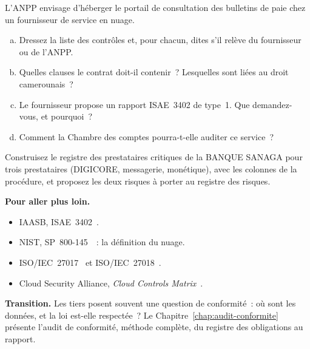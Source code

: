 \begin{boxexo}[title={\ding{45}\quad Exercice~24.9. Un nuage pour l'ANPP \niveauexpert}]
L'ANPP envisage d'héberger le portail de consultation des bulletins de paie
chez un fournisseur de service en nuage.
\begin{enumerate}[(a)]
    \item Dressez la liste des contrôles et, pour chacun, dites s'il
          relève du fournisseur ou de l'ANPP.
    \item Quelles clauses le contrat doit-il contenir~? Lesquelles sont
          liées au droit camerounais~?
    \item Le fournisseur propose un rapport ISAE~3402 de type~1. Que
          demandez-vous, et pourquoi~?
    \item Comment la Chambre des comptes pourra-t-elle auditer ce service~?
\end{enumerate}
\end{boxexo}

\begin{boxexo}[title={\ding{45}\quad Exercice~24.10. Le registre de la BANQUE SANAGA \niveauexpert}]
Construisez le registre des prestataires critiques de la BANQUE SANAGA pour
trois prestataires (DIGICORE, messagerie, monétique), avec les colonnes de
la procédure, et proposez les deux risques à porter au registre des
risques.
\end{boxexo}

\bigskip

\begin{boxinfo}
\textbf{Pour aller plus loin.}
\begin{itemize}
    \item IAASB, ISAE~3402~\cite{iaasb2011isae3402}.
    \item NIST, SP~800-145~\cite{nist2011sp800145}~: la définition du nuage.
    \item ISO/IEC~27017~\cite{iso27017_2015} et
          ISO/IEC~27018~\cite{iso27018_2019}.
    \item Cloud Security Alliance, \textit{Cloud Controls Matrix}~\cite{csa2021ccm}.
\end{itemize}
\end{boxinfo}

\begin{boxinfo}
\textbf{Transition.} Les tiers posent souvent une question de conformité~:
où sont les données, et la loi est-elle respectée~? Le
Chapitre~\ref{chap:audit-conformite} présente l'audit de conformité,
méthode complète, du registre des obligations au rapport.
\end{boxinfo}
